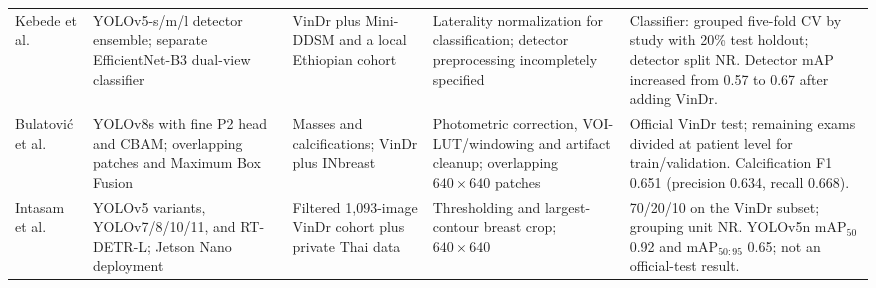 \begin{table}[t]
\begin{threeparttable}
\begin{tabularx}{\textwidth}{@{}>{\raggedright\arraybackslash}p{2.05cm}>{\raggedright\arraybackslash}p{3.35cm}>{\raggedright\arraybackslash}p{2.55cm}>{\raggedright\arraybackslash}p{2.75cm}X@{}}
Kebede et al. \cite{kebede2024dualview} & YOLOv5-s/m/l detector ensemble; separate EfficientNet-B3 dual-view classifier & VinDr plus Mini-DDSM and a local Ethiopian cohort & Laterality normalization for classification; detector preprocessing incompletely specified & Classifier: grouped five-fold CV by study with 20\% test holdout; detector split NR. Detector mAP increased from 0.57 to 0.67 after adding VinDr. \\
Bulatovi\'{c} et al. \cite{bulatovic2025patched} & YOLOv8s with fine P2 head and CBAM; overlapping patches and Maximum Box Fusion & Masses and calcifications; VinDr plus INbreast & Photometric correction, VOI-LUT/windowing and artifact cleanup; overlapping $640\!\times\!640$ patches & Official VinDr test; remaining exams divided at patient level for train/validation. Calcification F1 0.651 (precision 0.634, recall 0.668). \\
Intasam et al. \cite{intasam2025embedded} & YOLOv5 variants, YOLOv7/8/10/11, and RT-DETR-L; Jetson Nano deployment & Filtered 1,093-image VinDr cohort plus private Thai data & Thresholding and largest-contour breast crop; $640\!\times\!640$ & 70/20/10 on the VinDr subset; grouping unit NR. YOLOv5n mAP$_{50}$ 0.92 and mAP$_{50:95}$ 0.65; not an official-test result. \\
\bottomrule
\end{tabularx}
\end{threeparttable}
\end{table}

